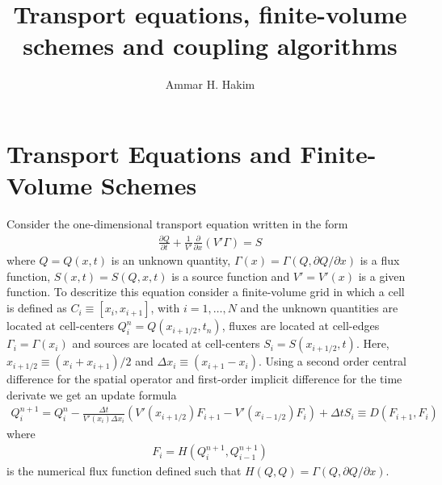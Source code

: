 \documentclass[11pt]{article}
\title{Transport equations, finite-volume schemes and coupling
  algorithms}
\author{Ammar H. Hakim}
\date{}
\newcommand{\pfrac}[2]{\frac{\partial #1}{\partial #2}}
\newcommand{\pfraca}[1]{\frac{\partial}{\partial #1}}
\newcommand{\pfracb}[2]{\partial #1/\partial #2}
\begin{document}
\maketitle

\section{Transport Equations and Finite-Volume Schemes}

Consider the one-dimensional transport equation written in the form
\begin{align}
  \pfrac{Q}{t} + \frac{1}{V'} \pfraca{x} \left( V' \Gamma \right) = S
\end{align}
where $Q = Q(x,t)$ is an unknown quantity, $\Gamma(x) =
\Gamma(Q,\pfracb{Q}{x})$ is a flux function, $S(x,t) = S(Q,x,t)$ is a
source function and $V' = V'(x)$ is a given function. To descritize
this equation consider a finite-volume grid in which a cell is defined
as $C_i \equiv [x_i, x_{i+1}]$, with $i=1,\ldots,N$ and the unknown
quantities are located at cell-centers $Q_i^n = Q(x_{i+1/2},t_n)$,
fluxes are located at cell-edges $\Gamma_i = \Gamma(x_i)$ and sources
are located at cell-centers $S_i = S(x_{i+1/2},t)$. Here, $x_{i+1/2}
\equiv (x_i+x_{i+1})/2$ and $\Delta x_i \equiv (x_{i+1}-x_i)$. Using a
second order central difference for the spatial operator and
first-order implicit difference for the time derivate we get an update
formula
\begin{align}
  Q_i^{n+1} = Q^n_i - \frac{\Delta t}{V'(x_i) \Delta x_i}
  \left (
    V'(x_{i+1/2}) F_{i+1} - V'(x_{i-1/2}) F_i
  \right)
  +
  \Delta t S_i \equiv D(F_{i+1}, F_{i}) \label{eqn:update-form}
\end{align}
where
\begin{align}
  F_i = H(Q_i^{n+1}, Q_{i-1}^{n+1}) \label{eqn:flux-func}
\end{align}
is the numerical flux function defined such that $H(Q,Q) =
\Gamma(Q,\pfracb{Q}{x})$.
\end{document}
